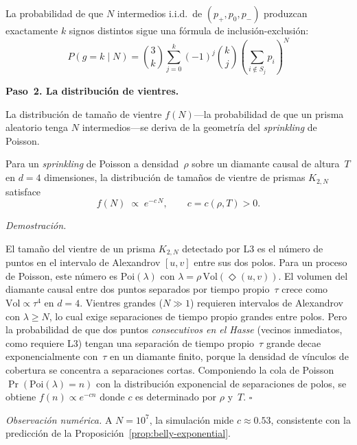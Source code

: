 \documentclass[11pt, a4paper, openany]{book}
\newcommand{\diam}[2]{\Diamond(#1,#2)}
\renewenvironment{proof}[1][Demostraci\'on]{%
  \par\noindent\textit{#1.}\quad
}{\hfill$\square$\par\medskip}
\begin{document}
La probabilidad de que $N$ intermedios i.i.d.\ de $(p_+, p_0, p_-)$
produzcan exactamente $k$ signos distintos sigue una f\'ormula de
inclusi\'on-exclusi\'on:
\begin{equation}
  P(g = k \mid N)
  = \binom{3}{k}\sum_{j=0}^{k}(-1)^j\binom{k}{j}
    \left(\sum_{i \notin S_j} p_i\right)^{\!N}
  \tag{$M$-III.1}
\end{equation}

\bigskip
\noindent
\textbf{Paso~2. La distribuci\'on de vientres.}

La distribuci\'on de tama\~no de vientre $f(N)$---la probabilidad de que
un prisma aleatorio tenga $N$ intermedios---se deriva de la geometr\'ia
del \emph{sprinkling} de Poisson.

\begin{proposition}
\label{prop:belly-exponential}
Para un \emph{sprinkling} de Poisson a densidad~$\rho$ sobre un
diamante causal de altura~$T$ en $d = 4$ dimensiones, la distribuci\'on
de tama\~nos de vientre de prismas $K_{2,N}$ satisface
\[
  f(N) \;\propto\; e^{-c\,N}, \qquad c = c(\rho, T) > 0.
\]
\end{proposition}

\begin{proof}
El tama\~no del vientre de un prisma $K_{2,N}$ detectado por
L3 es el n\'umero de puntos en el intervalo de Alexandrov $[u,v]$
entre sus dos polos. Para un proceso de Poisson, este n\'umero
es $\mathrm{Poi}(\lambda)$ con $\lambda = \rho\,\mathrm{Vol}(\diam{u}{v})$.
El volumen del diamante causal entre dos puntos separados por tiempo
propio~$\tau$ crece como $\mathrm{Vol} \propto \tau^4$ en $d = 4$.
Vientres grandes ($N \gg 1$) requieren intervalos de Alexandrov
con $\lambda \geq N$, lo cual exige separaciones de tiempo propio
grandes entre polos. Pero la probabilidad de que dos puntos
\emph{consecutivos en el Hasse} (vecinos inmediatos, como requiere L3)
tengan una separaci\'on de tiempo propio~$\tau$ grande decae
exponencialmente con~$\tau$ en un diamante finito, porque la
densidad de v\'inculos de cobertura se concentra a separaciones cortas.
Componiendo la cola de Poisson $\Pr(\mathrm{Poi}(\lambda) = n)$ con
la distribuci\'on exponencial de separaciones de polos, se obtiene
$f(n) \propto e^{-cn}$ donde $c$ es determinado por $\rho$ y~$T$.
\end{proof}

\noindent\textit{Observaci\'on num\'erica.}\enspace
A $N = 10^7$, la simulaci\'on mide $c \approx 0{.}53$, consistente con
la predicci\'on de la Proposici\'on~\ref{prop:belly-exponential}.
\end{document}
